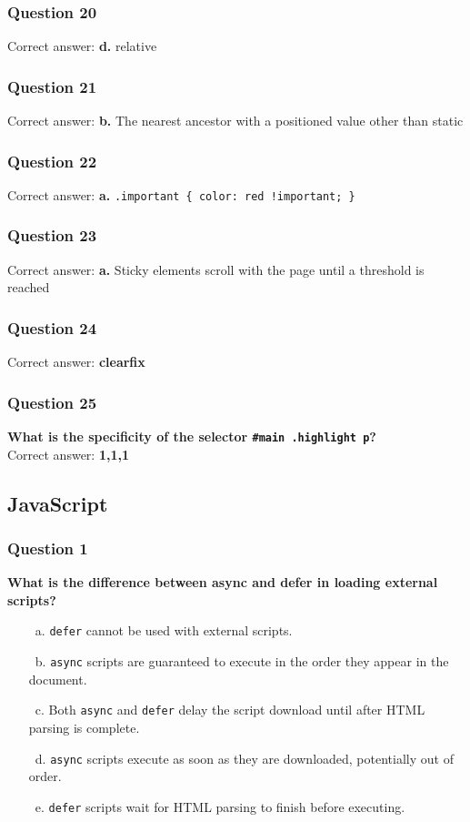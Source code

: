 \documentclass{article}
\newcommand{\cmark}{\textcolor{green}{\ding{51}}} %
\newcommand{\xmark}{\textcolor{red}{\ding{55}}}   %
\begin{document}
\subsubsection*{Question 20}
Correct answer: \textbf{d.} relative

\subsubsection*{Question 21}
Correct answer: \textbf{b.} The nearest ancestor with a positioned value other than static

\subsubsection*{Question 22}
Correct answer: \textbf{a.} \texttt{.important \{ color: red !important; \}}

\subsubsection*{Question 23}
Correct answer: \textbf{a.} Sticky elements scroll with the page until a threshold is reached

\subsubsection*{Question 24}
Correct answer: \textbf{clearfix}

\subsubsection*{Question 25}
\textbf{What is the specificity of the selector \texttt{\#main .highlight p}?} \\
Correct answer: \textbf{1,1,1}

\subsection{JavaScript}

\subsubsection*{Question 1}
\textbf{What is the difference between async and defer in loading external scripts?}
\begin{itemize}
  \item[\xmark\ a.] \texttt{defer} cannot be used with external scripts.
  \item[\xmark\ b.] \texttt{async} scripts are guaranteed to execute in the order they appear in the document.
  \item[\xmark\ c.] Both \texttt{async} and \texttt{defer} delay the script download until after HTML parsing is complete.
  \item[\cmark\ d.] \texttt{async} scripts execute as soon as they are downloaded, potentially out of order.
  \item[\cmark\ e.] \texttt{defer} scripts wait for HTML parsing to finish before executing.
\end{itemize}
\end{document}

